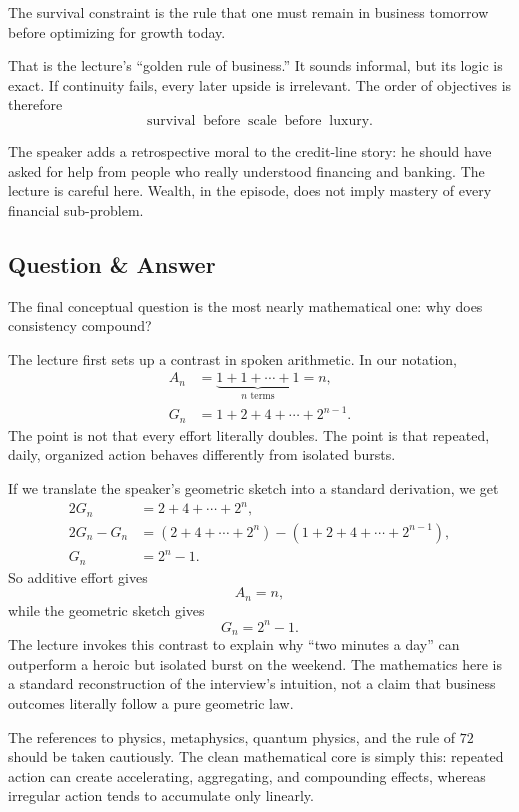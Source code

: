 \begin{definition}
The survival constraint is the rule that one must remain in business tomorrow before optimizing for growth today.
\end{definition}

That is the lecture's ``golden rule of business.'' It sounds informal, but its logic is exact. If continuity fails, every later upside is irrelevant. The order of objectives is therefore
\[
\text{survival} \;\; \text{before} \;\; \text{scale} \;\; \text{before} \;\; \text{luxury}.
\]

The speaker adds a retrospective moral to the credit-line story: he should have asked for help from people who really understood financing and banking. The lecture is careful here. Wealth, in the episode, does not imply mastery of every financial sub-problem.

\subsection{Question \& Answer}

The final conceptual question is the most nearly mathematical one: why does consistency compound?

The lecture first sets up a contrast in spoken arithmetic. In our notation,
\begin{align}
A_n &= \underbrace{1+1+\cdots+1}_{n\text{ terms}} = n,\\
G_n &= 1+2+4+\cdots+2^{n-1}.
\end{align}
The point is not that every effort literally doubles. The point is that repeated, daily, organized action behaves differently from isolated bursts.

If we translate the speaker's geometric sketch into a standard derivation, we get
\begin{align}
2G_n &= 2+4+\cdots+2^n,\\
2G_n-G_n &= (2+4+\cdots+2^n)-(1+2+4+\cdots+2^{n-1}),\\
G_n &= 2^n-1.
\end{align}
So additive effort gives
\[
A_n=n,
\]
while the geometric sketch gives
\[
G_n=2^n-1.
\]
The lecture invokes this contrast to explain why ``two minutes a day'' can outperform a heroic but isolated burst on the weekend. The mathematics here is a standard reconstruction of the interview's intuition, not a claim that business outcomes literally follow a pure geometric law.

\begin{remark}
The references to physics, metaphysics, quantum physics, and the rule of \(72\) should be taken cautiously. The clean mathematical core is simply this: repeated action can create accelerating, aggregating, and compounding effects, whereas irregular action tends to accumulate only linearly.
\end{remark}

